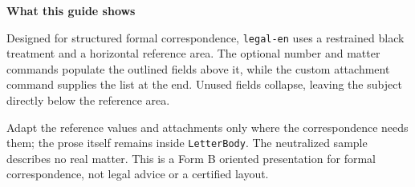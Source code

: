 

\UseRecipientManual
{}


\begin{LetterBody}

\textbf{What this guide shows}

Designed for structured formal correspondence, \texttt{legal-en} uses a restrained black treatment and a horizontal reference area. The optional number and matter commands populate the outlined fields above it, while the custom attachment command supplies the list at the end. Unused fields collapse, leaving the subject directly below the reference area.

Adapt the reference values and attachments only where the correspondence needs them; the prose itself remains inside \texttt{LetterBody}. The neutralized sample describes no real matter. This is a Form B oriented presentation for formal correspondence, not legal advice or a certified layout.

\end{LetterBody}
